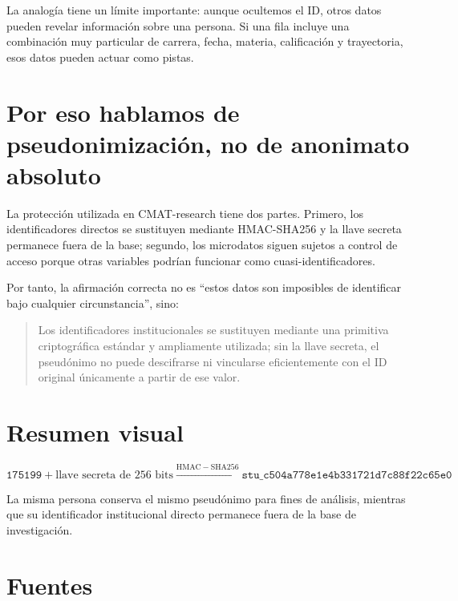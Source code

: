 \documentclass[11pt,a4paper]{article}
\begin{document}
La analogía tiene un límite importante: aunque ocultemos el ID, otros datos pueden revelar información sobre una persona. Si una fila incluye una combinación muy particular de carrera, fecha, materia, calificación y trayectoria, esos datos pueden actuar como pistas.

\section{Por eso hablamos de pseudonimización, no de anonimato absoluto}

La protección utilizada en CMAT-research tiene dos partes. Primero, los identificadores directos se sustituyen mediante HMAC-SHA256 y la llave secreta permanece fuera de la base; segundo, los microdatos siguen sujetos a control de acceso porque otras variables podrían funcionar como cuasi-identificadores.

Por tanto, la afirmación correcta no es ``estos datos son imposibles de identificar bajo cualquier circunstancia'', sino:

\begin{quote}
Los identificadores institucionales se sustituyen mediante una primitiva criptográfica estándar y ampliamente utilizada; sin la llave secreta, el pseudónimo no puede descifrarse ni vincularse eficientemente con el ID original únicamente a partir de ese valor.
\end{quote}

\section{Resumen visual}

\[
\boxed{
\texttt{175199}
+
\text{llave secreta de 256 bits}
\xrightarrow{\mathrm{HMAC\!-\!SHA256}}
\texttt{stu\_c504a778e1e4b331721d7c88f22c65e0}
}
\]

La misma persona conserva el mismo pseudónimo para fines de análisis, mientras que su identificador institucional directo permanece fuera de la base de investigación.

\section{Fuentes}
\end{document}
